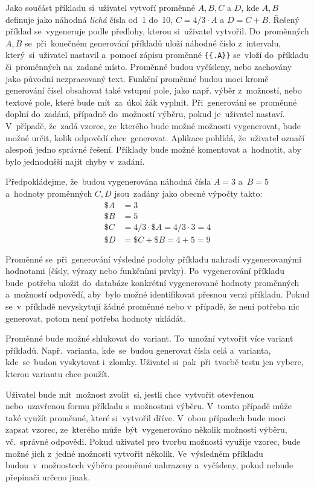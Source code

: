 \documentclass[11pt,a4paper]{report}
\begin{document}
            Jako součást příkladu si~uživatel vytvoří proměnné $A, B, C$ a $D$, kde $A, B$ definuje jako náhodná \emph{lichá} čísla od~1 do~10, $C = 4/3\cdot{A}$ a $D = C + B$. Řešený příklad se~vygeneruje podle předlohy, kterou si~uživatel vytvořil. Do~proměnných $A, B$ se~při~konečném generování příkladů uloží náhodné číslo z~intervalu, který~si~uživatel nastavil a~pomocí zápisu proměnné \texttt{\{\{.A\}\}} se~vloží do~příkladu či~proměnných na~zadané místo. Proměnné budou vyčísleny, nebo zachovány jako původní nezpracovaný text. Funkční proměnné budou moci kromě generování čísel obsahovat také vstupní pole, jako např. výběr z~možností, nebo textové pole, které bude mít~za~úkol žák vyplnit. Při~generování se~proměnné doplní do~zadání, případně do~možností výběru, pokud je~uživatel nastaví. V~případě, že~zadá vzorec, ze~kterého bude možné možnosti vygenerovat, bude možné určit, kolik odpovědí chce~generovat. Aplikace pohlídá, že~uživatel označí alespoň jedno správné řešení. Příklady bude možné komentovat a~hodnotit, aby bylo jednodušší najít chyby v~zadání.
            
            Předpokládejme, že~budou vygenerována náhodná čísla $A = 3$ a~$B = 5$ a~hodnoty proměnných $C, D$ jsou~zadány jako obecné výpočty takto:
            \begin{align*}
                \$A &= 3 \\
                \$B &= 5 \\
                \$C &= 4/3 \cdot \$A = 4/3 \cdot 3 = 4 \\
                \$D &= \$C + \$B = 4 + 5 = 9
            \end{align*}

            Proměnné se~při~generování výsledné podoby příkladu nahradí vygenerovanými hodnotami (čísly, výrazy nebo funkčními prvky). Po~vygenerování příkladu bude~potřeba uložit do~databáze konkrétní vygenerované hodnoty proměnných a~možností odpovědí, aby~bylo možné identifikovat přesnou verzi příkladu. Pokud se~v~příkladě nevyskytují žádné proměnné nebo v~případě, že není potřeba nic generovat, potom není potřeba hodnoty ukládát.

            Proměnné bude možné shlukovat do~variant. To~umožní vytvořit více variant příkladů. Např.~varianta, kde~se~budou generovat čísla celá a~varianta, kde~se~budou vyskytovat i~zlomky. Uživatel si~pak~při~tvorbě testu jen vybere, kterou variantu chce použít.

            Uživatel bude mít~možnost zvolit~si, jestli chce~vytvořit otevřenou nebo~uzavřenou formu příkladu s~možnostmi výběru. V~tomto případě může také využít proměnné, které si~vytvořil dříve. V~obou případech bude moci zapsat vzorec, ze~kterého může~být~vygenerováno několik možností výběru, vč.~správné odpovědi. Pokud uživatel pro tvorbu možnosti využije vzorec, bude možné jich z~jedné možnosti vytvořit několik. Ve~výsledném příkladu budou~v~možnostech výběru proměnné nahrazeny a~vyčísleny, pokud nebude přepínači určeno jinak.
\end{document}
